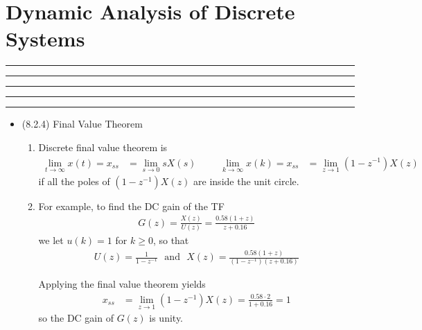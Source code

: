 \setcounter{chapter}{7}
\setcounter{section}{1}
\section{Dynamic Analysis of Discrete Systems}
\vspace{-8pt} \hrule \hrule \hrule \hrule \hrule  \vspace{12pt}
\begin{itemize}
\item (8.2.4) Final Value Theorem 
	\begin{enumerate}
		\item Discrete final value theorem is 
		\begin{align*}
			\lim_{t \rightarrow \infty} x(t) = x_{ss} &= \lim_{s \rightarrow 0} sX(s) &&&
			\lim_{k \rightarrow \infty} x(k) = x_{ss} &= \lim_{z \rightarrow 1} (1-z^{-1}) X(z) 
		\end{align*}
		if all the poles of $(1-z^{-1}) X(z)$ are inside the unit circle. 
		\item For example, to find the DC gain of the TF
		\begin{align*}
			G(z) = \frac{X(z)}{U(z)} = \frac{0.58(1+z)}{z+0.16} 
		\end{align*}
		we let $u(k) =1 $ for $k \geq 0$, so that 
		\begin{align*}
			U(z) = \frac{1}{1-z^{-1}} ~~~\text{and} ~~~ X(z) = \frac{0.58(1+z)}{(1-z^{-1})(z+0.16)}
		\end{align*}

		Applying the final value theorem yields 
		\begin{align*}
			x_{ss} &= \lim_{z \rightarrow 1} (1-z^{-1}) X(z) = \frac{0.58 \cdot 2}{1+0.16} = 1
		\end{align*}
		so the DC gain of $G(z)$ is unity. 
	\end{enumerate}
\end{itemize}	